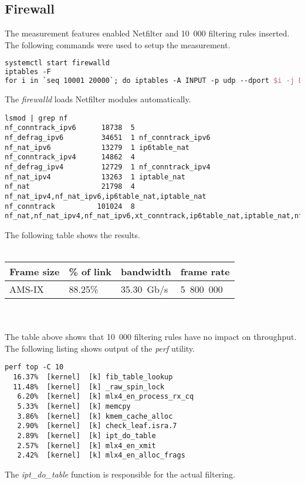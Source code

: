 
\subsection{Firewall}
The measurement features enabled Netfilter and 10~000 filtering rules inserted.
The following commands were used to setup the measurement.
\begin{lstlisting}[language=TeX]
systemctl start firewalld
iptables -F
for i in `seq 10001 20000`; do iptables -A INPUT -p udp --dport $i -j DROP; done
\end{lstlisting}
The {\it{firewalld}} loads Netfilter modules automatically.
\begin{lstlisting}
lsmod | grep nf
nf_conntrack_ipv6      18738  5 
nf_defrag_ipv6         34651  1 nf_conntrack_ipv6
nf_nat_ipv6            13279  1 ip6table_nat
nf_conntrack_ipv4      14862  4 
nf_defrag_ipv4         12729  1 nf_conntrack_ipv4
nf_nat_ipv4            13263  1 iptable_nat
nf_nat                 21798  4 nf_nat_ipv4,nf_nat_ipv6,ip6table_nat,iptable_nat
nf_conntrack          101024  8 nf_nat,nf_nat_ipv4,nf_nat_ipv6,xt_conntrack,ip6table_nat,iptable_nat,nf_conntrack_ipv4,nf_conntrack_ipv6
\end{lstlisting}
The following table shows the results.
\\
\\
\begin{tabular}{ | l | l | l | l | }
\hline
Frame size & \% of link & bandwidth & frame rate \\
\hline
AMS-IX & 88.25\% & 35.30~Gb/s & 5~800~000 \\
\hline
\end{tabular}
\\
\\
The table above shows that 10~000 filtering rules have no impact on throughput.
The following listing shows output of the {\it{perf}} utility.
\begin{lstlisting}
perf top -C 10
  16.37%  [kernel]  [k] fib_table_lookup
  11.48%  [kernel]  [k] _raw_spin_lock
   6.20%  [kernel]  [k] mlx4_en_process_rx_cq
   5.33%  [kernel]  [k] memcpy
   3.86%  [kernel]  [k] kmem_cache_alloc
   2.90%  [kernel]  [k] check_leaf.isra.7
   2.89%  [kernel]  [k] ipt_do_table
   2.57%  [kernel]  [k] mlx4_en_xmit
   2.42%  [kernel]  [k] mlx4_en_alloc_frags
\end{lstlisting}
The {\it{ipt\_do\_table}} function is responsible for the actual filtering.
